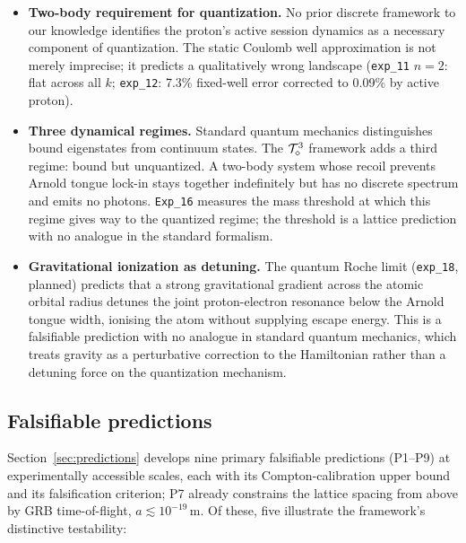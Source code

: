 \begin{itemize}

\item \textbf{Two-body requirement for quantization.}
No prior discrete framework to our knowledge identifies the proton's
active session dynamics as a necessary component of quantization.
The static Coulomb well approximation is not merely imprecise; it
predicts a qualitatively wrong landscape (\texttt{exp\_11} $n{=}2$:
flat across all $k$; \texttt{exp\_12}: 7.3\% fixed-well error
corrected to 0.09\% by active proton).

\item \textbf{Three dynamical regimes.}
Standard quantum mechanics distinguishes bound eigenstates from
continuum states.
The $\mathcal{T}_\diamond^3$ framework adds a third regime: bound but unquantized.
A two-body system whose recoil prevents Arnold tongue lock-in stays
together indefinitely but has no discrete spectrum and emits no photons.
\texttt{Exp\_16} measures the mass threshold at which this regime
gives way to the quantized regime; the threshold is a lattice prediction
with no analogue in the standard formalism.

\item \textbf{Gravitational ionization as detuning.}
The quantum Roche limit (\texttt{exp\_18}, planned) predicts that a
strong gravitational gradient across the atomic orbital radius detunes
the joint proton-electron resonance below the Arnold tongue width,
ionising the atom without supplying escape energy.
This is a falsifiable prediction with no analogue in standard quantum
mechanics, which treats gravity as a perturbative correction to the
Hamiltonian rather than a detuning force on the quantization mechanism.

\end{itemize}

\subsection*{Falsifiable predictions}

Section~\ref{sec:predictions} develops nine primary falsifiable
predictions (P1--P9) at experimentally accessible scales, each with
its Compton-calibration upper bound and its falsification criterion;
P7 already constrains the lattice spacing from above by GRB
time-of-flight, $a \lesssim 10^{-19}\,\text{m}$.
Of these, five illustrate the framework's distinctive testability:

